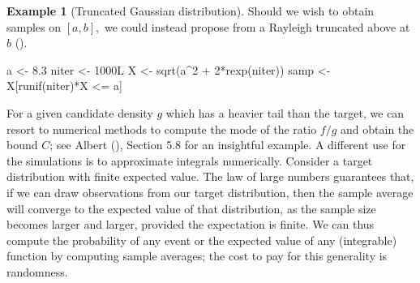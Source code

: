 \documentclass[
  11pt,
  letterpaper,
]{scrbook}
\newenvironment{Shaded}{\begin{snugshade}}{\end{snugshade}}
\newcommand{\DecValTok}[1]{\textcolor[rgb]{0.68,0.00,0.00}{#1}}
\newcommand{\FloatTok}[1]{\textcolor[rgb]{0.68,0.00,0.00}{#1}}
\newcommand{\FunctionTok}[1]{\textcolor[rgb]{0.28,0.35,0.67}{#1}}
\newcommand{\NormalTok}[1]{\textcolor[rgb]{0.00,0.23,0.31}{#1}}
\newcommand{\OtherTok}[1]{\textcolor[rgb]{0.00,0.23,0.31}{#1}}
\newcommand{\SpecialCharTok}[1]{\textcolor[rgb]{0.37,0.37,0.37}{#1}}
\theoremstyle{definition}
\newtheorem{example}{Example}[chapter]
\theoremstyle{plain}
\theoremstyle{plain}
\theoremstyle{plain}
\theoremstyle{definition}
\theoremstyle{definition}
\theoremstyle{plain}
\theoremstyle{plain}
\theoremstyle{remark}
\begin{document}
\begin{example}[Truncated Gaussian
distribution]
Should we wish to obtain samples on \([a,b],\) we could instead propose
from a Rayleigh truncated above at \(b\)
().

\begin{Shaded}
\begin{Highlighting}[]
\NormalTok{a }\OtherTok{\textless{}{-}} \FloatTok{8.3}
\NormalTok{niter }\OtherTok{\textless{}{-}} \DecValTok{1000}\NormalTok{L}
\NormalTok{X }\OtherTok{\textless{}{-}} \FunctionTok{sqrt}\NormalTok{(a}\SpecialCharTok{\^{}}\DecValTok{2} \SpecialCharTok{+} \DecValTok{2}\SpecialCharTok{*}\FunctionTok{rexp}\NormalTok{(niter))}
\NormalTok{samp }\OtherTok{\textless{}{-}}\NormalTok{ X[}\FunctionTok{runif}\NormalTok{(niter)}\SpecialCharTok{*}\NormalTok{X }\SpecialCharTok{\textless{}=}\NormalTok{ a]}
\end{Highlighting}
\end{Shaded}

\end{example}

For a given candidate density \(g\) which has a heavier tail than the
target, we can resort to numerical methods to compute the mode of the
ratio \(f/g\) and obtain the bound \(C\); see Albert
(), Section 5.8 for an insightful
example. A different use for the simulations is to approximate integrals
numerically. Consider a target distribution with finite expected value.
The law of large numbers guarantees that, if we can draw observations
from our target distribution, then the sample average will converge to
the expected value of that distribution, as the sample size becomes
larger and larger, provided the expectation is finite. We can thus
compute the probability of any event or the expected value of any
(integrable) function by computing sample averages; the cost to pay for
this generality is randomness.
\end{document}
